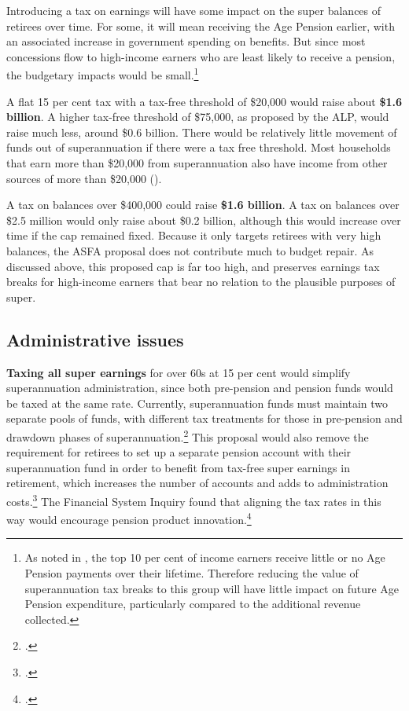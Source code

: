 Introducing a tax on earnings will have some impact on the super balances of retirees over time. For some, it will mean receiving the Age Pension earlier, with an associated increase in government spending on benefits. But since most concessions flow to high-income earners who are least likely to receive a pension, the budgetary impacts would be small.\footnote{As noted in , the top 10 per cent of income earners receive little or no Age Pension payments over their lifetime. Therefore reducing the value of superannuation tax breaks to this group will have little impact on future Age Pension expenditure, particularly compared to the additional revenue collected.} 

A flat 15 per cent tax with a tax-free threshold of \$20,000 would raise about \textbf{\$1.6 billion}. A higher tax-free threshold of \$75,000, as proposed by the ALP, would raise much less, around \$0.6 billion. There would be relatively little movement of funds out of superannuation if there were a tax free threshold. Most households that earn more than \$20,000 from superannuation also have income from other sources of more than \$20,000 ().

A tax on balances over \$400,000 could raise \textbf{\$1.6 billion}.  A tax on balances over \$2.5 million would only raise about \$0.2 billion, although this would increase over time if the cap remained fixed. Because it only targets retirees with very high balances, the ASFA proposal does not contribute much to budget repair. As discussed above, this proposed cap is far too high, and preserves earnings tax breaks for high-income earners that bear no relation to the plausible purposes of super.

\subsection{Administrative issues}
\textbf{Taxing all super earnings} for over 60s at 15 per cent would simplify superannuation administration, since both pre-pension and pension funds would be taxed at the same rate. Currently, superannuation funds must maintain two separate pools of funds, with different tax treatments for those in pre-pension and drawdown phases of superannuation.\footcite[][44]{FinancialSystemsInquiry2015}  This proposal would also remove the requirement for retirees to set up a separate pension account with their superannuation fund in order to benefit from tax-free super earnings in retirement, which increases the number of accounts and adds to administration costs.\footcite{RiceWarner2015SubmissionTaxWhitePaper}  The Financial System Inquiry found that aligning the tax rates in this way would encourage pension product innovation.\footcite[][139]{FinancialSystemsInquiry2015} 


